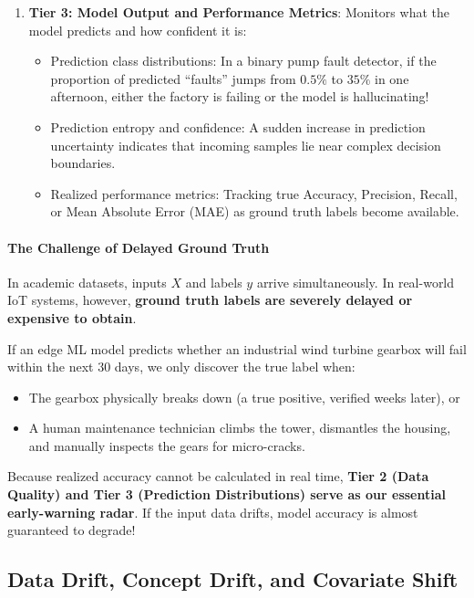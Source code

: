 \begin{enumerate}
    \item \textbf{Tier 3: Model Output and Performance Metrics}:
    Monitors what the model predicts and how confident it is:
    \begin{itemize}
        \item Prediction class distributions: In a binary pump fault detector, if the proportion of predicted ``faults'' jumps from $0.5\%$ to $35\%$ in one afternoon, either the factory is failing or the model is hallucinating!
        \item Prediction entropy and confidence: A sudden increase in prediction uncertainty indicates that incoming samples lie near complex decision boundaries.
        \item Realized performance metrics: Tracking true Accuracy, Precision, Recall, or Mean Absolute Error (MAE) as ground truth labels become available.
    \end{itemize}
\end{enumerate}

\paragraph{The Challenge of Delayed Ground Truth}
In academic datasets, inputs $X$ and labels $y$ arrive simultaneously. In real-world IoT systems, however, \textbf{ground truth labels are severely delayed or expensive to obtain}. 

If an edge ML model predicts whether an industrial wind turbine gearbox will fail within the next 30 days, we only discover the true label when:
\begin{itemize}
    \item The gearbox physically breaks down (a true positive, verified weeks later), or
    \item A human maintenance technician climbs the tower, dismantles the housing, and manually inspects the gears for micro-cracks.
\end{itemize}
Because realized accuracy cannot be calculated in real time, \textbf{Tier 2 (Data Quality) and Tier 3 (Prediction Distributions) serve as our essential early-warning radar}. If the input data drifts, model accuracy is almost guaranteed to degrade!

\subsection{Data Drift, Concept Drift, and Covariate Shift}\label{subsec:drift_types}

